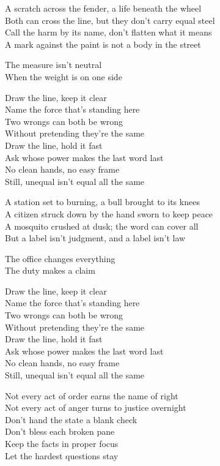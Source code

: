 \begin{lyrics}
A scratch across the fender, a life beneath the wheel\\
Both can cross the line, but they don't carry equal steel\\
Call the harm by its name, don't flatten what it means\\
A mark against the paint is not a body in the street

The measure isn't neutral\\
When the weight is on one side

Draw the line, keep it clear\\
Name the force that's standing here\\
Two wrongs can both be wrong\\
Without pretending they're the same\\
Draw the line, hold it fast\\
Ask whose power makes the last word last\\
No clean hands, no easy frame\\
Still, unequal isn't equal all the same

A station set to burning, a bull brought to its knees\\
A citizen struck down by the hand sworn to keep peace\\
A mosquito crushed at dusk; the word can cover all\\
But a label isn't judgment, and a label isn't law

The office changes everything\\
The duty makes a claim

Draw the line, keep it clear\\
Name the force that's standing here\\
Two wrongs can both be wrong\\
Without pretending they're the same\\
Draw the line, hold it fast\\
Ask whose power makes the last word last\\
No clean hands, no easy frame\\
Still, unequal isn't equal all the same

Not every act of order earns the name of right\\
Not every act of anger turns to justice overnight\\
Don't hand the state a blank check\\
Don't bless each broken pane\\
Keep the facts in proper focus\\
Let the hardest questions stay


\end{lyrics}
